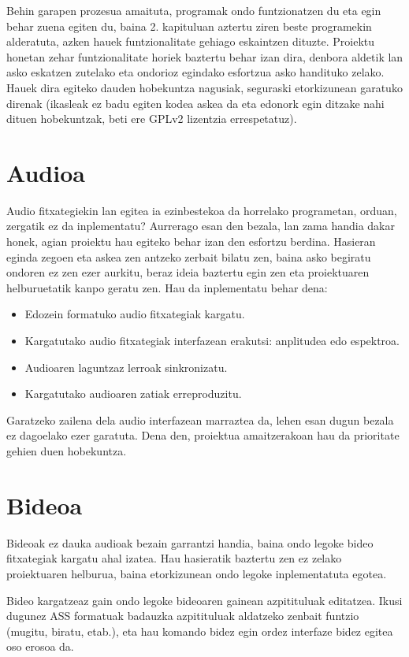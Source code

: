 Behin garapen prozesua amaituta, programak ondo funtzionatzen du eta egin behar zuena egiten du, baina 2. kapituluan aztertu ziren beste programekin alderatuta, azken hauek funtzionalitate gehiago eskaintzen dituzte. Proiektu honetan zehar funtzionalitate horiek baztertu behar izan dira, denbora aldetik lan asko eskatzen zutelako eta ondorioz egindako esfortzua asko handituko zelako. Hauek dira egiteko dauden hobekuntza nagusiak, seguraski etorkizunean garatuko direnak (ikasleak ez badu egiten kodea askea da eta edonork egin ditzake nahi dituen hobekuntzak, beti ere GPLv2 lizentzia errespetatuz).

\section{Audioa}
Audio fitxategiekin lan egitea ia ezinbestekoa da horrelako programetan, orduan, zergatik ez da inplementatu? Aurrerago esan den bezala, lan zama handia dakar honek, agian proiektu hau egiteko behar izan den esfortzu berdina. Hasieran eginda zegoen eta askea zen antzeko zerbait bilatu zen, baina asko begiratu ondoren ez zen ezer aurkitu, beraz ideia baztertu egin zen eta proiektuaren helburuetatik kanpo geratu zen. Hau da inplementatu behar dena:

\begin{itemize}
	\item Edozein formatuko audio fitxategiak kargatu.
	\item Kargatutako audio fitxategiak interfazean erakutsi: anplitudea edo espektroa.
	\item Audioaren laguntzaz lerroak sinkronizatu.
	\item Kargatutako audioaren zatiak erreproduzitu.
\end{itemize}

Garatzeko zailena dela audio interfazean marraztea da, lehen esan dugun bezala ez dagoelako ezer garatuta. Dena den, proiektua amaitzerakoan hau da prioritate gehien duen hobekuntza.

\section{Bideoa}
Bideoak ez dauka audioak bezain garrantzi handia, baina ondo legoke bideo fitxategiak kargatu ahal izatea. Hau hasieratik baztertu zen ez zelako proiektuaren helburua, baina etorkizunean ondo legoke inplementatuta egotea.

Bideo kargatzeaz gain ondo legoke bideoaren gainean azpitituluak editatzea. Ikusi dugunez ASS formatuak badauzka azpitituluak aldatzeko zenbait funtzio (mugitu, biratu, etab.), eta hau komando bidez egin ordez interfaze bidez egitea oso erosoa da.

